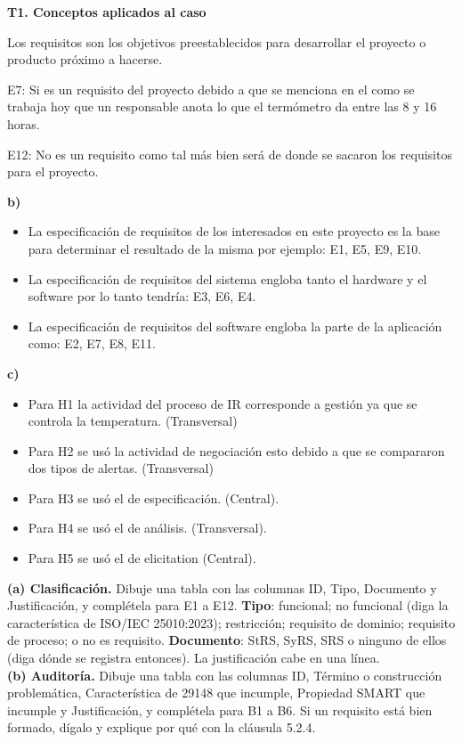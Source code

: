 \documentclass[11pt]{article}
\begin{document}
	\begin{cajarespuesta}[title={Respuestas del estudiante: T1}]
		\textbf{T1. Conceptos aplicados al caso}
		
		Los requisitos son los objetivos preestablecidos para desarrollar el proyecto o producto próximo a hacerse.
		
		E7: Si es un requisito del proyecto debido a que se menciona en el como se trabaja hoy que un responsable anota lo que el termómetro da entre las 8 y 16 horas.
		
		E12: No es un requisito como tal más bien será de donde se sacaron los requisitos para el proyecto.
		
		\textbf{b)}
		
		\begin{itemize}[leftmargin=*]
			\item La especificación de requisitos de los interesados en este proyecto es la base para determinar el resultado de la misma por ejemplo: E1, E5, E9, E10.
			\item La especificación de requisitos del sistema engloba tanto el hardware y el software por lo tanto tendría: E3, E6, E4.
			\item La especificación de requisitos del software engloba la parte de la aplicación como: E2, E7, E8, E11.
		\end{itemize}
		
		\textbf{c)}
		
		\begin{itemize}[leftmargin=*]
			\item Para H1 la actividad del proceso de IR corresponde a gestión ya que se controla la temperatura. (Transversal)
			\item Para H2 se usó la actividad de negociación esto debido a que se compararon dos tipos de alertas. (Transversal)
			\item Para H3 se usó el de especificación. (Central).
			\item Para H4 se usó el de análisis. (Transversal).
			\item Para H5 se usó el de elicitation (Central).
		\end{itemize}
	\end{cajarespuesta}
	
	\begin{cajatarea}[title={T2. Clasificación y auditoría \hfill D2 · 30\,\%}]
		\textbf{(a) Clasificación.} Dibuje una tabla con las columnas ID, Tipo, Documento y Justificación, y complétela para E1 a E12. \textbf{Tipo}: funcional; no funcional (diga la característica de ISO/IEC 25010:2023); restricción; requisito de dominio; requisito de proceso; o no es requisito. \textbf{Documento}: StRS, SyRS, SRS o ninguno de ellos (diga dónde se registra entonces). La justificación cabe en una línea.\\[4pt]
		\textbf{(b) Auditoría.} Dibuje una tabla con las columnas ID, Término o construcción problemática, Característica de 29148 que incumple, Propiedad SMART que incumple y Justificación, y complétela para B1 a B6. Si un requisito está bien formado, dígalo y explique por qué con la cláusula 5.2.4.
	\end{cajatarea}
	
\end{document}
